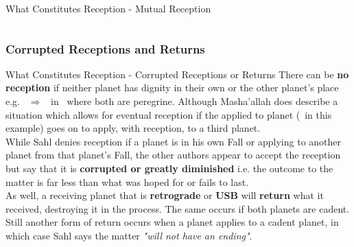 \begin{frame}[t]{What Constitutes Reception - Mutual Reception}
\begin{columns}[T, onlytextwidth]
\end{columns}
\end{frame}
\subsubsection{Corrupted Receptions and Returns}
\begin{frame}[t]{What Constitutes Reception - Corrupted Receptions or Returns}
There can be \textbf{no reception} if neither planet has dignity in their own or the other planet's place e.g. \Mercury\ $\Rightarrow$ \Jupiter\ in \Taurus\ where both are peregrine. Although Masha'allah does describe a situation which allows for eventual reception if the applied to planet (\Jupiter\ in this example) goes on to apply, with reception, to a third planet.\\
\vspace{0.25cm}
While Sahl denies reception if a planet is in his own Fall or applying to another planet from that planet's Fall, the other authors appear to accept the reception but say that it is \textbf{corrupted or greatly diminished} i.e. the outcome to the matter is far less than what was hoped for or fails to last.\\
\vspace{0.25cm}
As well, a receiving planet that is \textbf{retrograde} or \textbf{USB} will \textbf{return} what it received, destroying it in the process. The same occurs if both planets are cadent.\footnotemark[1] \\
\vspace{0.25cm}
Still another form of return occurs when a planet applies to a cadent planet, in which case Sahl says the matter \textsl{"will not have an ending"}.

\end{frame}
